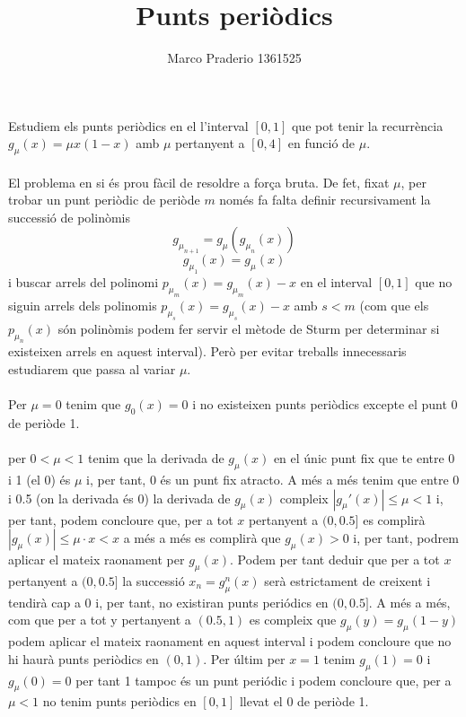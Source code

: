 \documentclass[a4paper,10pt]{article}
\title{Punts periòdics}
\author{Marco Praderio 1361525}
\date{}
\renewcommand{\*}{\cdot}
\begin{document}
\maketitle
Estudiem els punts periòdics en el l'interval $[0,1]$ que pot tenir la recurrència $g_{\mu}(x)=\mu x(1-x)$ amb $\mu$ pertanyent a $[0,4]$ en funció de $\mu$.\\
\phantom{-}\\
El problema en si és prou fàcil de resoldre a força bruta. De fet, fixat $\mu$, per trobar un punt periòdic de periòde $m$ només fa falta definir recursivament la successió
de polinòmis
\begin{equation*}
g_{\mu_{n+1}}=g_{\mu}(g_{\mu_n}(x))
\end{equation*}
\begin{equation*}
g_{\mu_1}(x)=g_{\mu}(x)
\end{equation*}
i buscar arrels del polinomi $p_{\mu_m}(x)=g_{\mu_m}(x)-x$ en el interval $[0,1]$ que no siguin arrels dels polinomis $p_{\mu_s}(x)=g_{\mu_s}(x)-x$ amb   $s<m$
(com que els $p_{\mu_n}(x)$ són polinòmis podem fer servir el mètode de Sturm per determinar si existeixen arrels en aquest interval). Però per evitar treballs innecessaris
estudiarem que passa al variar $\mu$.\\
\phantom{.}\\
Per $\mu=0$ tenim que $g_0(x)=0$ i no existeixen punts periòdics excepte el punt 0 de periòde 1.\\
\phantom{.}\\
per $0<\mu<1$ tenim que la derivada de $g_{\mu}(x)$ en el únic punt fix que te entre 0 i 1 (el 0) és $\mu$ i, per tant, 0 és un punt fix atracto. A més a més tenim que entre
0 i 0.5 (on la derivada és 0) la derivada de $g_{\mu}(x)$ compleix $|g_{\mu}'(x)|\le \mu<1$ i, per tant, podem concloure que, per a tot $x$ pertanyent a $(0,0.5]$
es complirà $|g_{\mu}(x)|\le\mu\*x<x$ a més a més es complirà que   $g_{\mu}(x)>0$  i, per tant, podrem aplicar el mateix raonament per $g_{\mu}(x)$. Podem per tant deduir
que per a tot $x$ pertanyent a $(0,0.5]$ la successió  $x_n=g_{\mu}^n(x)$ serà estrictament de creixent i tendirà cap a 0 i, per tant, no existiran punts periódics en 
$(0,0.5]$. A més a més, com que per a tot y pertanyent a $(0.5,1)$ es compleix que $g_{\mu}(y)=g_{\mu}(1-y)$ podem aplicar el mateix raonament en aquest interval i podem
concloure que no hi haurà punts periòdics en $(0,1)$. Per últim per $x=1$ tenim $g_{\mu}(1)=0$ i $g_{\mu}(0)=0$ per tant 1 tampoc és un punt periódic i podem concloure que,
per a $\mu<1$ no tenim punts periòdics en $[0,1]$ llevat el 0 de periòde 1.\\
\end{document}
